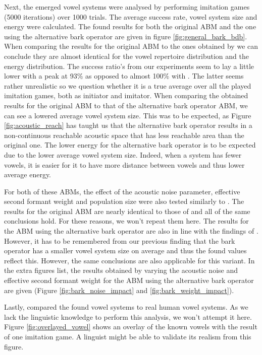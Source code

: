 Next, the emerged vowel systems were analysed by performing imitation games (5000 iterations) over 1000 trials.
The average success rate, vowel system size and energy were calculated.
The found results for both the original ABM and the one using the alternative bark operator are given in figure \ref{fig:general_bark_bdb}.
When comparing the results for the original ABM to the ones obtained by \citet{deBoer2000} we can conclude they are almost identical for the vowel repertoire distribution and the energy distribution.
The success ratio's from our experiments seem to lay a little lower with a peak at 93\% as opposed to almost 100\% with \citet{deBoer2000}.
The latter seems rather unrealistic so we question whether it is a true average over all the played imitation games, both as initiator and imitator.
When comparing the obtained results for the original ABM to that of the alternative bark operator ABM, we can see a lowered average vowel system size.
This was to be expected, as Figure \ref{fig:acoustic_reach} has taught us that the alternative bark operator results in a non-continuous reachable acoustic space that has less reachable area than the original one.
The lower energy for the alternative bark operator is to be expected due to the lower average vowel system size.
Indeed, when a system has fewer vowels, it is easier for it to have more distance between vowels and thus lower average energy.

\clearpage
For both of these ABMs, the effect of the acoustic noise parameter, effective second formant weight and population size were also tested similarly to \citet{deBoer2000}.
The results for the original ABM are nearly identical to those of \citet{deBoer2000} and all of the same conclusions hold.
For these reasons, we won't repeat them here.
The results for the ABM using the alternative bark operator are also in line with the findings of \citet{deBoer2000}.
However, it has to be remembered from our previous finding that the bark operator has a smaller vowel system size on average and thus the found values reflect this.
However, the same conclusions are also applicable for this variant.
In the extra figures list, the results obtained by varying the acoustic noise and effective second formant weight for the ABM using the alternative bark operator are given (Figure \ref{fig:bark_noise_impact} and \ref{fig:bark_weight_impact}).

Lastly, \citet{deBoer2000} compared the found vowel systems to real human vowel systems.
As we lack the linguistic knowledge to perform this analysis, we won't attempt it here.
Figure \ref{fig:overlayed_vowel} shows an overlay of the known vowels with the result of one imitation game.
A linguist might be able to validate its realism from this figure.

